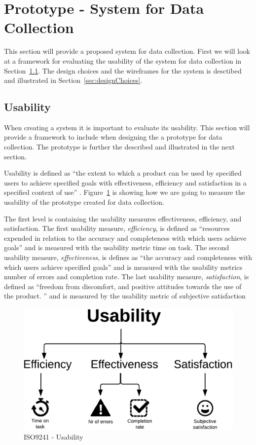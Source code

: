 \section{Prototype - System for Data Collection}
\label{sec:wireframes}

  This section will provide a proposed system for data collection. First we will look at a framework for evaluating the usability of the system for data collection in Section~\ref{sec:usability}. The design choices and the wireframes for the system is desctibed and illustrated in Section~\ref{sec:designChoices}. 

  \subsection{Usability} \label{sec:usability}

  When creating a system it is important to evaluate its usability. This section will provide a framework to include when designing the a prototype for data collection. The prototype is further the described and illustrated in the next section. 

  Usability is defined as ``the extent to which a product can be used by specified users to achieve specified goals with effectiveness, efficiency and satisfaction in a specified context of use'' \cite{ISO9241}. Figure~\ref{fig:usability} is showing how we are going to measure the usability of the prototype created for data collection.

  The first level is containing the usability measures effectiveness, efficiency, and satisfaction. The first usability measure, {\it efficiency}, is defined as ``resources expended in relation to the accuracy and completeness with which users achieve goals'' and is measured with the usability metric time on task. The second usability measure, {\it effectiveness}, is defines as ``the accuracy and completeness with which users achieve specified goals'' and is measured with the usability metrics number of errors and completion rate. The last usability measure, {\it satisfaction}, is defined as ``freedom from discomfort, and positive attitudes towards the use of the product. '' and is measured by the usability metric of subjective satisfaction

  \begin{figure}[H]
    \centering
    \includegraphics[scale=0.25]{pics/usability.png}
    \caption[ISO9241 - Usability]{ISO9241 - Usability \cite{ISO9241}}
    \label{fig:usability}
  \end{figure}

